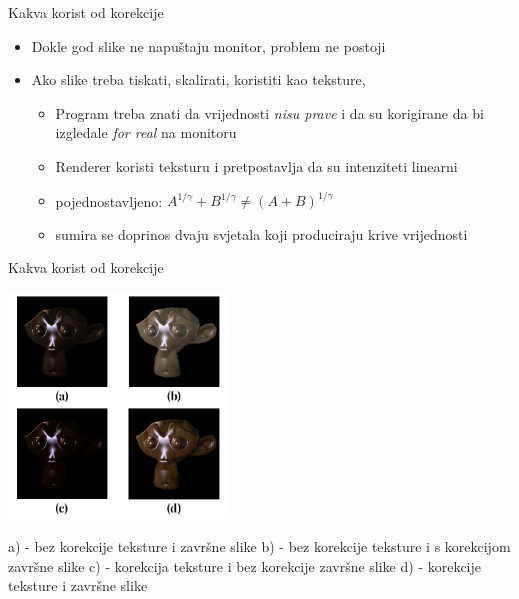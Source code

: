 \documentclass[9pt]{beamer}
\begin{document}
\begin{frame}{Kakva korist od korekcije}
	\begin{itemize}
		\item Dokle god slike ne napuštaju monitor, problem ne postoji 
		\item Ako slike treba tiskati, skalirati, koristiti kao teksture,
		\begin{itemize}
			\item Program treba znati da vrijednosti \textsl{nisu prave} i da su korigirane da bi 
			izgledale \textsl{for real} na monitoru
			\item Renderer koristi teksturu  i pretpostavlja da su intenziteti linearni
			\item pojednostavljeno: $A^{1/\gamma} + B^{1/\gamma} \neq (A+B)^{1/\gamma}$
			\item sumira se doprinos dvaju svjetala koji produciraju krive vrijednosti
		\end{itemize}
	\end{itemize}
	
\end{frame}

\begin{frame}{Kakva korist od korekcije}
	\begin{center}
		\includegraphics[height=6cm]{slike/monkey_a.png}
	\end{center}
	a) - bez korekcije teksture i završne slike 
	b) - bez korekcije teksture i s korekcijom završne slike
	c) - korekcija teksture i bez korekcije završne slike 
	d) - korekcije teksture i završne slike 
	
\end{frame}	
\end{document}
